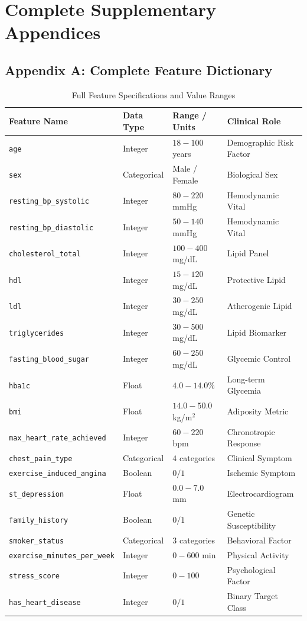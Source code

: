\appendix

\chapter{Complete Supplementary Appendices}

\section{Appendix A: Complete Feature Dictionary}
\begin{table}[H]
\centering
\caption{Full Feature Specifications and Value Ranges}
\label{tab:app_dict}
\small
\begin{tabular}{llll}
\toprule
\textbf{Feature Name} & \textbf{Data Type} & \textbf{Range / Units} & \textbf{Clinical Role} \\
\midrule
\texttt{age} & Integer & $18 - 100$ years & Demographic Risk Factor \\
\texttt{sex} & Categorical & Male / Female & Biological Sex \\
\texttt{resting\_bp\_systolic} & Integer & $80 - 220$ mmHg & Hemodynamic Vital \\
\texttt{resting\_bp\_diastolic} & Integer & $50 - 140$ mmHg & Hemodynamic Vital \\
\texttt{cholesterol\_total} & Integer & $100 - 400$ mg/dL & Lipid Panel \\
\texttt{hdl} & Integer & $15 - 120$ mg/dL & Protective Lipid \\
\texttt{ldl} & Integer & $30 - 250$ mg/dL & Atherogenic Lipid \\
\texttt{triglycerides} & Integer & $30 - 500$ mg/dL & Lipid Biomarker \\
\texttt{fasting\_blood\_sugar} & Integer & $60 - 250$ mg/dL & Glycemic Control \\
\texttt{hba1c} & Float & $4.0 - 14.0\%$ & Long-term Glycemia \\
\texttt{bmi} & Float & $14.0 - 50.0$ kg/m$^2$ & Adiposity Metric \\
\texttt{max\_heart\_rate\_achieved} & Integer & $60 - 220$ bpm & Chronotropic Response \\
\texttt{chest\_pain\_type} & Categorical & $4$ categories & Clinical Symptom \\
\texttt{exercise\_induced\_angina} & Boolean & $0 / 1$ & Ischemic Symptom \\
\texttt{st\_depression} & Float & $0.0 - 7.0$ mm & Electrocardiogram \\
\texttt{family\_history} & Boolean & $0 / 1$ & Genetic Susceptibility \\
\texttt{smoker\_status} & Categorical & $3$ categories & Behavioral Factor \\
\texttt{exercise\_minutes\_per\_week} & Integer & $0 - 600$ min & Physical Activity \\
\texttt{stress\_score} & Integer & $0 - 100$ & Psychological Factor \\
\texttt{has\_heart\_disease} & Integer & $0 / 1$ & Binary Target Class \\
\bottomrule
\end{tabular}
\end{table}

